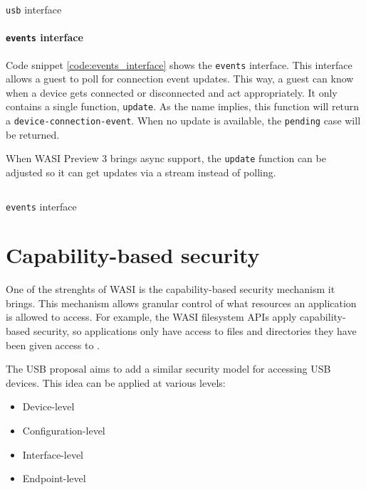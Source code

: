 \begin{code}
\inputminted[breaklines]{text}{WIT/wit/device.wit}
\caption{\texttt{usb} interface}
\label{code:usb_interface}
\end{code}

\paragraph{\texttt{events} interface}

Code snippet \ref{code:events_interface} shows the \texttt{events} interface. This interface allows a guest to poll for connection event updates. This way, a guest can know when a device gets connected or disconnected and act appropriately. It only contains a single function, \texttt{update}. As the name implies, this function will return a \texttt{device-connection-event}. When no update is available, the \texttt{pending} case will be returned.

When \acrshort{WASI} Preview 3 brings async support, the \texttt{update} function can be adjusted so it can get updates via a stream instead of polling.\\

\begin{code}
\inputminted[breaklines]{text}{WIT/wit/events.wit}
\caption{\texttt{events} interface}
\label{code:events_interface}
\end{code}

\section{Capability-based security}
\label{section:capability_based_security}
One of the strenghts of \acrshort{WASI} is the capability-based security mechanism it brings. This mechanism allows granular control of what resources an application is allowed to access. For example, the \acrshort{WASI} filesystem APIs apply capability-based security, so applications only have access to files and directories they have been given access to \cite{wasi_security}.

The \acrshort{USB} proposal aims to add a similar security model for accessing USB devices. This idea can be applied at various levels:
\begin{itemize}
\item Device-level
\item Configuration-level
\item Interface-level
\item Endpoint-level
\end{itemize}

